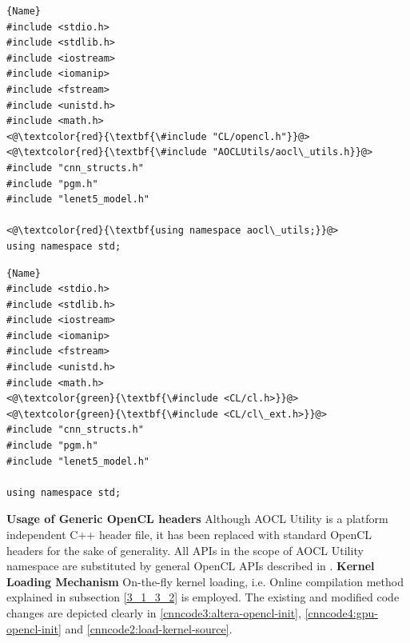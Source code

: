 \newcommand{\grn}{\makebox[0pt][l]{\color{hg}\rule[-4pt]{0.9\linewidth}{10pt}}}
\newcommand{\rd}{\makebox[0pt][l]{\color{hr}\rule[-4pt]{0.9\linewidth}{10pt}}}
\noindent\begin{minipage}{.45\textwidth}
\begin{lstlisting}[caption=Header files for Altera FPGA,frame=tlrb]{Name}
#include <stdio.h>
#include <stdlib.h>
#include <iostream>
#include <iomanip>
#include <fstream>
#include <unistd.h>
#include <math.h>
<@\textcolor{red}{\textbf{\#include "CL/opencl.h"}}@>
<@\textcolor{red}{\textbf{\#include "AOCLUtils/aocl\_utils.h}}@>
#include "cnn_structs.h"
#include "pgm.h"
#include "lenet5_model.h"

<@\textcolor{red}{\textbf{using namespace aocl\_utils;}}@>
using namespace std;
\end{lstlisting}
\end{minipage}\hfill
\begin{minipage}{.45\textwidth}
\begin{lstlisting}[caption=Header files for \\ GPU,frame=tlrb]{Name}
#include <stdio.h>
#include <stdlib.h>
#include <iostream>
#include <iomanip>
#include <fstream>
#include <unistd.h>
#include <math.h>
<@\textcolor{green}{\textbf{\#include <CL/cl.h>}}@>
<@\textcolor{green}{\textbf{\#include <CL/cl\_ext.h>}}@>
#include "cnn_structs.h"
#include "pgm.h"
#include "lenet5_model.h"

using namespace std;
\end{lstlisting}
\end{minipage}\newline
\textbf{Usage of Generic OpenCL headers} \newline
Although AOCL Utility is a platform independent C++ header file, it has been replaced with standard OpenCL headers for the sake of generality. All APIs in the scope of AOCL Utility namespace are substituted by general OpenCL APIs described in \cite{opencl_khronos}. \newline \newline
\textbf{Kernel Loading Mechanism}\newline
On-the-fly kernel loading, i.e. Online compilation method explained in subsection \ref{3_1_3_2} is employed. The existing and modified code changes are depicted clearly in \ref{cnncode3:altera-opencl-init}, \ref{cnncode4:gpu-opencl-init} and \ref{cnncode2:load-kernel-source}.\newline \newline
